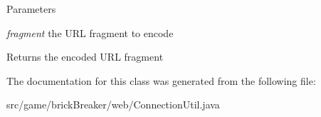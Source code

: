 \begin{DoxyParams}{Parameters}
\item[{\em fragment}]the URL fragment to encode \end{DoxyParams}
\begin{DoxyReturn}{Returns}
the encoded URL fragment 
\end{DoxyReturn}


The documentation for this class was generated from the following file:\begin{DoxyCompactItemize}
\item 
src/game/brickBreaker/web/ConnectionUtil.java\end{DoxyCompactItemize}
